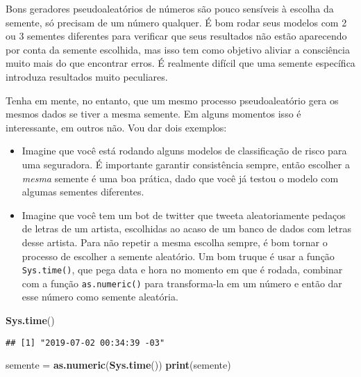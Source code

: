 \documentclass[]{article}
\newenvironment{Shaded}{\begin{snugshade}}{\end{snugshade}}
\newcommand{\KeywordTok}[1]{\textcolor[rgb]{0.13,0.29,0.53}{\textbf{#1}}}
\newcommand{\StringTok}[1]{\textcolor[rgb]{0.31,0.60,0.02}{#1}}
\newcommand{\NormalTok}[1]{#1}
\begin{document}
Bons geradores pseudoaleatórios de números são pouco sensíveis à escolha
da semente, só precisam de um número qualquer. É bom rodar seus modelos
com 2 ou 3 sementes diferentes para verificar que seus resultados não
estão aparecendo por conta da semente escolhida, mas isso tem como
objetivo aliviar a consciência muito mais do que encontrar erros. É
realmente difícil que uma semente específica introduza resultados muito
peculiares.

Tenha em mente, no entanto, que um mesmo processo pseudoaleatório gera
os mesmos dados se tiver a mesma semente. Em alguns momentos isso é
interessante, em outros não. Vou dar dois exemplos:

\begin{itemize}
\item
  Imagine que você está rodando alguns modelos de classificação de risco
  para uma seguradora. É importante garantir consistência sempre, então
  escolher a \emph{mesma} semente é uma boa prática, dado que você já
  testou o modelo com algumas sementes diferentes.
\item
  Imagine que você tem um bot de twitter que tweeta aleatoriamente
  pedaços de letras de um artista, escolhidas ao acaso de um banco de
  dados com letras desse artista. Para não repetir a mesma escolha
  sempre, é bom tornar o processo de escolher a semente aleatório. Um
  bom truque é usar a função \texttt{Sys.time()}, que pega data e hora
  no momento em que é rodada, combinar com a função
  \texttt{as.numeric()} para transforma-la em um número e então dar esse
  número como semente aleatória.
\end{itemize}

\begin{Shaded}
\begin{Highlighting}[]
\KeywordTok{Sys.time}\NormalTok{()}
\end{Highlighting}
\end{Shaded}

\begin{verbatim}
## [1] "2019-07-02 00:34:39 -03"
\end{verbatim}

\begin{Shaded}
\begin{Highlighting}[]
\NormalTok{semente =}\StringTok{ }\KeywordTok{as.numeric}\NormalTok{(}\KeywordTok{Sys.time}\NormalTok{())}
\KeywordTok{print}\NormalTok{(semente)}
\end{Highlighting}
\end{Shaded}
\end{document}
